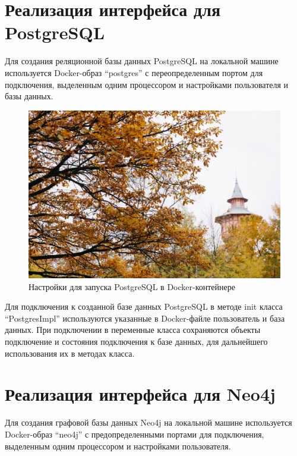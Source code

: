 \section{Реализация интерфейса для PostgreSQL}

Для создания реляционной базы данных PostgreSQL на локальной машине используется Docker-образ “postgres” с переопределенным портом для подключения, выделенным одним процессором и настройками пользователя и базы данных.

\begin{figure}[ht!]
    \center
    \includegraphics [scale=0.27] {my_folder/images//spbpu_hydrotower}
    \caption{Настройки для запуска PostgreSQL в Docker-контейнере}
\end{figure}

Для подключения к созданной базе данных PostgreSQL в методе init класса “PostgresImpl” используются указанные в Docker-файле пользователь и база данных. При подключении в переменные класса сохраняются объекты подключение и состояния подключения к базе данных, для дальнейшего использования их в методах класса.


\section{Реализация интерфейса для Neo4j}

Для создания графовой базы данных Neo4j на локальной машине используется Docker-образ “neo4j” с предопределенными портами для подключения, выделенным одним процессором и настройками пользователя.

